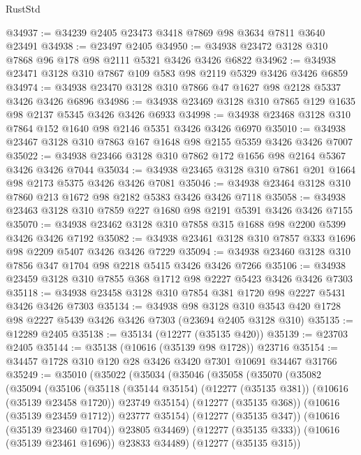 \begin{lexlean}{RustStd}
\begin{coremodule}
@34937 := @34239 @2405 @23473 @3418 @7869 @98 @3634 @7811 @3640 @23491
@34938 := @23497 @2405
@34950 := @34938 @23472 @3128 @310 @7868 @96 @178 @98 @2111 @5321 @3426 @3426 @6822
@34962 := @34938 @23471 @3128 @310 @7867 @109 @583 @98 @2119 @5329 @3426 @3426 @6859
@34974 := @34938 @23470 @3128 @310 @7866 @47 @1627 @98 @2128 @5337 @3426 @3426 @6896
@34986 := @34938 @23469 @3128 @310 @7865 @129 @1635 @98 @2137 @5345 @3426 @3426 @6933
@34998 := @34938 @23468 @3128 @310 @7864 @152 @1640 @98 @2146 @5351 @3426 @3426 @6970
@35010 := @34938 @23467 @3128 @310 @7863 @167 @1648 @98 @2155 @5359 @3426 @3426 @7007
@35022 := @34938 @23466 @3128 @310 @7862 @172 @1656 @98 @2164 @5367 @3426 @3426 @7044
@35034 := @34938 @23465 @3128 @310 @7861 @201 @1664 @98 @2173 @5375 @3426 @3426 @7081
@35046 := @34938 @23464 @3128 @310 @7860 @213 @1672 @98 @2182 @5383 @3426 @3426 @7118
@35058 := @34938 @23463 @3128 @310 @7859 @227 @1680 @98 @2191 @5391 @3426 @3426 @7155
@35070 := @34938 @23462 @3128 @310 @7858 @315 @1688 @98 @2200 @5399 @3426 @3426 @7192
@35082 := @34938 @23461 @3128 @310 @7857 @333 @1696 @98 @2209 @5407 @3426 @3426 @7229
@35094 := @34938 @23460 @3128 @310 @7856 @347 @1704 @98 @2218 @5415 @3426 @3426 @7266
@35106 := @34938 @23459 @3128 @310 @7855 @368 @1712 @98 @2227 @5423 @3426 @3426 @7303
@35118 := @34938 @23458 @3128 @310 @7854 @381 @1720 @98 @2227 @5431 @3426 @3426 @7303
@35134 := @34938
    @98
    @3128
    @310
    @3543
    @420
    @1728
    @98
    @2227
    @5439
    @3426
    @3426
    @7303
    (@23694 @2405 @3128 @310)
@35135 := @12289 @2405
@35138 := @35134 (@12277 (@35135 @420))
@35139 := @23703 @2405
@35144 := @35138 (@10616 (@35139 @98 @1728)) @23716
@35154 := @34457 @1728 @310 @120 @28 @3426 @3420 @7301 @10691 @34467 @31766
@35249 := @35010
    (@35022
      (@35034
        (@35046
          (@35058
            (@35070
              (@35082
                (@35094
                  (@35106
                    (@35118
                      (@35144 @35154)
                      (@12277 (@35135 @381))
                      (@10616 (@35139 @23458 @1720))
                      @23749
                      @35154)
                    (@12277 (@35135 @368))
                    (@10616 (@35139 @23459 @1712))
                    @23777
                    @35154)
                  (@12277 (@35135 @347))
                  (@10616 (@35139 @23460 @1704))
                  @23805
                  @34469)
                (@12277 (@35135 @333))
                (@10616 (@35139 @23461 @1696))
                @23833
                @34489)
              (@12277 (@35135 @315))

\end{coremodule}
\end{lexlean}
